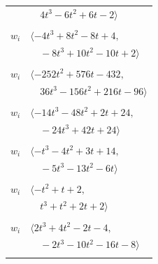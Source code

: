 \documentclass[11pt]{article}
\begin{document}
\begin{longtable}{@{}ll@{}}
 & $\quad 4t^{3}-6t^{2}+6t-2\rangle$\\
\addlinespace[2pt]
\multicolumn{2}{@{}p{0.97\textwidth}@{}}{$i=23$, $D_i=1$, $\rho_{ij}$: $0{:}2, \allowbreak 16{:}1, \allowbreak 31{:}1, \allowbreak 32{:}2, \allowbreak 37{:}2, \allowbreak 40{:}2$}\\
$w_i$ & $\langle -4t^{3}+8t^{2}-8t+4,$\\
 & $\quad -8t^{3}+10t^{2}-10t+2\rangle$\\
\addlinespace[2pt]
\multicolumn{2}{@{}p{0.97\textwidth}@{}}{$i=24$, $D_i=1$, $\rho_{ij}$: $1{:}2, \allowbreak 2{:}1, \allowbreak 7{:}2, \allowbreak 8{:}1, \allowbreak 11{:}1, \allowbreak 13{:}2, \allowbreak 25{:}2, \allowbreak 35{:}2, \allowbreak 36{:}1, \allowbreak 39{:}2, \allowbreak 44{:}1$}\\
$w_i$ & $\langle -252t^{2}+576t-432,$\\
 & $\quad 36t^{3}-156t^{2}+216t-96\rangle$\\
\addlinespace[2pt]
\multicolumn{2}{@{}p{0.97\textwidth}@{}}{$i=25$, $D_i=1$, $\rho_{ij}$: $0{:}2, \allowbreak 7{:}2, \allowbreak 9{:}2, \allowbreak 12{:}1, \allowbreak 20{:}1, \allowbreak 21{:}2, \allowbreak 24{:}1, \allowbreak 38{:}1, \allowbreak 44{:}2$}\\
$w_i$ & $\langle -14t^{3}-48t^{2}+2t+24,$\\
 & $\quad -24t^{3}+42t+24\rangle$\\
\addlinespace[2pt]
\multicolumn{2}{@{}p{0.97\textwidth}@{}}{$i=26$, $D_i=1$, $\rho_{ij}$: $6{:}1, \allowbreak 8{:}1, \allowbreak 13{:}1, \allowbreak 20{:}2, \allowbreak 21{:}2, \allowbreak 29{:}1$}\\
$w_i$ & $\langle -t^{3}-4t^{2}+3t+14,$\\
 & $\quad -5t^{3}-13t^{2}-6t\rangle$\\
\addlinespace[2pt]
\multicolumn{2}{@{}p{0.97\textwidth}@{}}{$i=27$, $D_i=1$, $\rho_{ij}$: $1{:}1, \allowbreak 2{:}2, \allowbreak 4{:}1, \allowbreak 14{:}1, \allowbreak 45{:}2$}\\
$w_i$ & $\langle -t^{2}+t+2,$\\
 & $\quad t^{3}+t^{2}+2t+2\rangle$\\
\addlinespace[2pt]
\multicolumn{2}{@{}p{0.97\textwidth}@{}}{$i=28$, $D_i=1$, $\rho_{ij}$: $1{:}2, \allowbreak 10{:}2, \allowbreak 11{:}2, \allowbreak 21{:}1, \allowbreak 43{:}2$}\\
$w_i$ & $\langle 2t^{3}+4t^{2}-2t-4,$\\
 & $\quad -2t^{3}-10t^{2}-16t-8\rangle$\\
\addlinespace[2pt]

\end{longtable}
\end{document}
